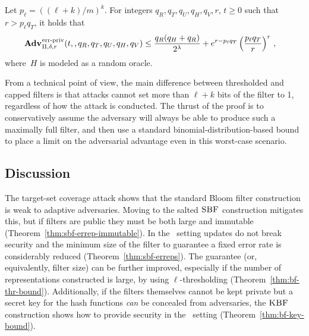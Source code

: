 \begin{theorem}
\label{thm:bf-thr-bound}
\label{thm:sbf-erreps-th}
Let $p_\ell = ((\ell+k)/m)^k$. For integers $q_R, q_T, q_U, q_H, q_V, r$, $t \geq 0$ such
that $r > p_\ell q_T$, it holds that
  \begin{equation*}
    \begin{aligned}
      \Adv{\erreps}_{\Pi,\delta,r}(t,\,&,q_R,q_T,q_U,q_H,q_V) \leq \frac{q_R(q_H+q_R)}{2^\lambda} + e^{r-p_\ell q_T}\left(\frac{p_\ell q_T}{r}\right)^r
        \,,
    \end{aligned}
  \end{equation*}
  where~$H$ is modeled as a random oracle.
\end{theorem}

From a technical point of view, the main difference between thresholded and
capped filters is that attacks cannot set more than $\ell+k$ bits of the filter
to 1, regardless of how the attack is conducted. The thrust of the proof is to
conservatively assume the adversary will always be able to produce such a maximally full
filter, and then use a standard binomial-distribution-based bound to place a
limit on the adversarial advantage even in this worst-case scenario.




\subsection{Discussion}

The target-set coverage attack shows that the standard Bloom filter construction is weak to
adaptive adversaries. Moving to the salted $\textnormal{\textsc{SBF}}$ construction mitigates this,
but if filters are public they must be both large and immutable (Theorem~\ref{thm:sbf-errep-immutable}). In the \erreps\
setting updates do not break security and the minimum size of the filter to
guarantee a fixed error rate is considerably reduced (Theorem~\ref{thm:sbf-erreps}). The guarantee (or,
equivalently, filter size) can be further improved, especially if the number of
representations constructed is large, by using $\ell$-thresholding (Theorem~\ref{thm:bf-thr-bound}).
Additionally, if the filters themselves cannot be kept private but a secret key
for the hash functions \emph{can} be concealed from adversaries, the $\textnormal{\textsc{KBF}}$
construction shows how to provide security in the \errep\ setting (Theorem~\ref{thm:bf-key-bound}).

